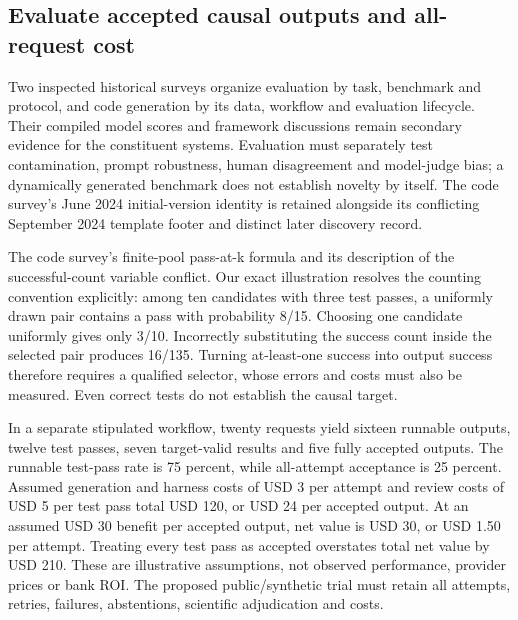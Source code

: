 \hypertarget{evaluate-accepted-causal-outputs-and-all-request-cost}{%
\subsection{Evaluate accepted causal outputs and all-request
cost}\label{evaluate-accepted-causal-outputs-and-all-request-cost}}

Two inspected historical surveys organize evaluation by task, benchmark
and protocol, and code generation by its data, workflow and evaluation
lifecycle. Their compiled model scores and framework discussions remain
secondary evidence for the constituent systems. Evaluation must
separately test contamination, prompt robustness, human disagreement and
model-judge bias; a dynamically generated benchmark does not establish
novelty by itself. The code survey's June 2024 initial-version identity
is retained alongside its conflicting September 2024 template footer and
distinct later discovery record.
\citep{exec19_surveys_evaluation,exec19_surveys_code}

The code survey's finite-pool pass-at-k formula and its description of
the successful-count variable conflict. Our exact illustration resolves
the counting convention explicitly: among ten candidates with three test
passes, a uniformly drawn pair contains a pass with probability 8/15.
Choosing one candidate uniformly gives only 3/10. Incorrectly
substituting the success count inside the selected pair produces 16/135.
Turning at-least-one success into output success therefore requires a
qualified selector, whose errors and costs must also be measured. Even
correct tests do not establish the causal target.
\citep{exec19_surveys_code,exec19_surveys_reference}

In a separate stipulated workflow, twenty requests yield sixteen
runnable outputs, twelve test passes, seven target-valid results and
five fully accepted outputs. The runnable test-pass rate is 75 percent,
while all-attempt acceptance is 25 percent. Assumed generation and
harness costs of USD 3 per attempt and review costs of USD 5 per test
pass total USD 120, or USD 24 per accepted output. At an assumed USD 30
benefit per accepted output, net value is USD 30, or USD 1.50 per
attempt. Treating every test pass as accepted overstates total net value
by USD 210. These are illustrative assumptions, not observed
performance, provider prices or bank ROI. The proposed public/synthetic
trial must retain all attempts, retries, failures, abstentions,
scientific adjudication and costs. \citep{exec19_surveys_reference}

